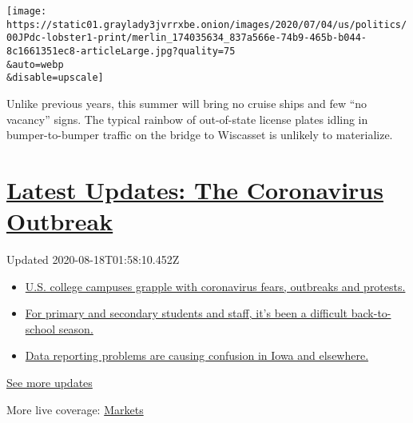 \texttt{[image: https://static01.graylady3jvrrxbe.onion/images/2020/07/04/us/politics/00JPdc-lobster1-print/merlin\_174035634\_837a566e-74b9-465b-b044-8c1661351ec8-articleLarge.jpg?quality=75\\\&auto=webp\\\&disable=upscale]}

Unlike previous years, this summer will bring no cruise ships and few
``no vacancy'' signs. The typical rainbow of out-of-state license plates
idling in bumper-to-bumper traffic on the bridge to Wiscasset is
unlikely to materialize.

\hypertarget{latest-updates-the-coronavirus-outbreak}{%
\section{\texorpdfstring{\href{https://www.nytimes3xbfgragh.onion/2020/08/17/world/coronavirus-covid.html?action=click\&pgtype=Article\&state=default\&region=MAIN_CONTENT_1\&context=storylines_live_updates}{Latest
Updates: The Coronavirus
Outbreak}}{Latest Updates: The Coronavirus Outbreak}}\label{latest-updates-the-coronavirus-outbreak}}

Updated 2020-08-18T01:58:10.452Z

\begin{itemize}
\tightlist
\item
  \href{https://www.nytimes3xbfgragh.onion/2020/08/17/world/coronavirus-covid.html?action=click\&pgtype=Article\&state=default\&region=MAIN_CONTENT_1\&context=storylines_live_updates\#link-6fdbc8ef}{U.S.
  college campuses grapple with coronavirus fears, outbreaks and
  protests.}
\item
  \href{https://www.nytimes3xbfgragh.onion/2020/08/17/world/coronavirus-covid.html?action=click\&pgtype=Article\&state=default\&region=MAIN_CONTENT_1\&context=storylines_live_updates\#link-12d68713}{For
  primary and secondary students and staff, it's been a difficult
  back-to-school season.}
\item
  \href{https://www.nytimes3xbfgragh.onion/2020/08/17/world/coronavirus-covid.html?action=click\&pgtype=Article\&state=default\&region=MAIN_CONTENT_1\&context=storylines_live_updates\#link-6aa8318c}{Data
  reporting problems are causing confusion in Iowa and elsewhere.}
\end{itemize}

\href{https://www.nytimes3xbfgragh.onion/2020/08/17/world/coronavirus-covid.html?action=click\&pgtype=Article\&state=default\&region=MAIN_CONTENT_1\&context=storylines_live_updates}{See
more updates}

More live coverage:
\href{https://www.nytimes3xbfgragh.onion/live/2020/08/17/business/stock-market-today-coronavirus?action=click\&pgtype=Article\&state=default\&region=MAIN_CONTENT_1\&context=storylines_live_updates}{Markets}

